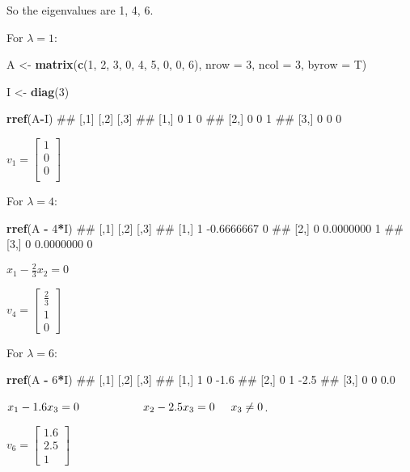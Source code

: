 \documentclass[]{article}
\newenvironment{Shaded}{\begin{snugshade}}{\end{snugshade}}
\newcommand{\KeywordTok}[1]{\textcolor[rgb]{0.13,0.29,0.53}{\textbf{#1}}}
\newcommand{\DataTypeTok}[1]{\textcolor[rgb]{0.13,0.29,0.53}{#1}}
\newcommand{\DecValTok}[1]{\textcolor[rgb]{0.00,0.00,0.81}{#1}}
\newcommand{\StringTok}[1]{\textcolor[rgb]{0.31,0.60,0.02}{#1}}
\newcommand{\OperatorTok}[1]{\textcolor[rgb]{0.81,0.36,0.00}{\textbf{#1}}}
\newcommand{\NormalTok}[1]{#1}
\begin{document}
So the eigenvalues are 1, 4, 6.

For \(\lambda = 1\):

\begin{Shaded}
\begin{Highlighting}[]
\NormalTok{A <-}\StringTok{ }\KeywordTok{matrix}\NormalTok{(}\KeywordTok{c}\NormalTok{(}\DecValTok{1}\NormalTok{, }\DecValTok{2}\NormalTok{, }\DecValTok{3}\NormalTok{,}
              \DecValTok{0}\NormalTok{, }\DecValTok{4}\NormalTok{, }\DecValTok{5}\NormalTok{,}
              \DecValTok{0}\NormalTok{, }\DecValTok{0}\NormalTok{, }\DecValTok{6}\NormalTok{),}
            \DataTypeTok{nrow =} \DecValTok{3}\NormalTok{, }\DataTypeTok{ncol =} \DecValTok{3}\NormalTok{, }\DataTypeTok{byrow =}\NormalTok{ T)}

\NormalTok{I <-}\StringTok{ }\KeywordTok{diag}\NormalTok{(}\DecValTok{3}\NormalTok{)}

\KeywordTok{rref}\NormalTok{(A}\OperatorTok{-}\NormalTok{I)}
\NormalTok{##      [,1] [,2] [,3]}
\NormalTok{## [1,]    0    1    0}
\NormalTok{## [2,]    0    0    1}
\NormalTok{## [3,]    0    0    0}
\end{Highlighting}
\end{Shaded}

\(v_1 = \begin{bmatrix}1\\0\\0\\\end{bmatrix}\)

For \(\lambda = 4\):

\begin{Shaded}
\begin{Highlighting}[]
\KeywordTok{rref}\NormalTok{(A }\OperatorTok{-}\StringTok{ }\DecValTok{4}\OperatorTok{*}\NormalTok{I)}
\NormalTok{##      [,1]       [,2] [,3]}
\NormalTok{## [1,]    1 -0.6666667    0}
\NormalTok{## [2,]    0  0.0000000    1}
\NormalTok{## [3,]    0  0.0000000    0}
\end{Highlighting}
\end{Shaded}

\(x_1 - \frac{2}{3}x_2 = 0\)

\(v_4 = \begin{bmatrix}\frac{2}{3}\\1\\0\end{bmatrix}\)

For \(\lambda = 6\):

\begin{Shaded}
\begin{Highlighting}[]
\KeywordTok{rref}\NormalTok{(A }\OperatorTok{-}\StringTok{ }\DecValTok{6}\OperatorTok{*}\NormalTok{I)}
\NormalTok{##      [,1] [,2] [,3]}
\NormalTok{## [1,]    1    0 -1.6}
\NormalTok{## [2,]    0    1 -2.5}
\NormalTok{## [3,]    0    0  0.0}
\end{Highlighting}
\end{Shaded}

\(x_1 - 1.6x_3 = 0 \hspace{20mm} x_2 - 2.5x_3 = 0 \hspace{5mm} x_3\neq 0\).

\(v_6 = \begin{bmatrix}1.6 \\ 2.5 \\ 1 \end{bmatrix}\)
\end{document}
